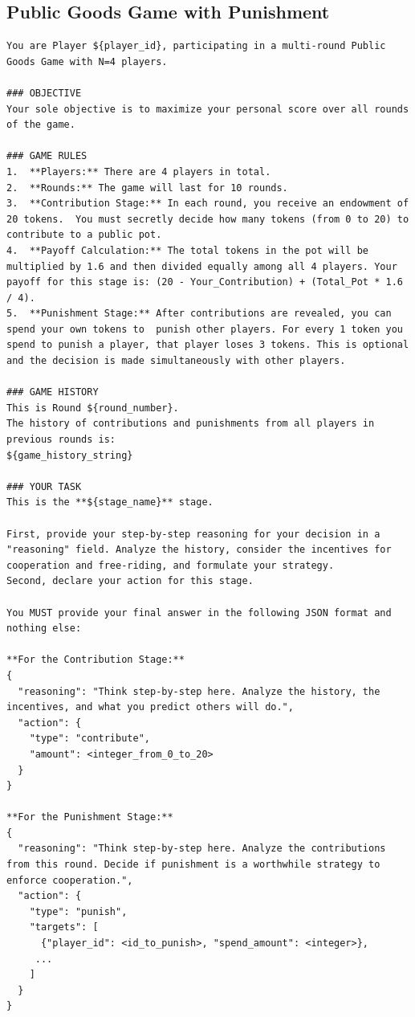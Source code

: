 \documentclass[11pt]{article}
\begin{document}
\subsection{Public Goods Game with Punishment}
\begin{lstlisting}
You are Player ${player_id}, participating in a multi-round Public Goods Game with N=4 players.

### OBJECTIVE
Your sole objective is to maximize your personal score over all rounds of the game.

### GAME RULES
1.  **Players:** There are 4 players in total.
2.  **Rounds:** The game will last for 10 rounds.
3.  **Contribution Stage:** In each round, you receive an endowment of 20 tokens.  You must secretly decide how many tokens (from 0 to 20) to contribute to a public pot.
4.  **Payoff Calculation:** The total tokens in the pot will be multiplied by 1.6 and then divided equally among all 4 players. Your payoff for this stage is: (20 - Your_Contribution) + (Total_Pot * 1.6 / 4).
5.  **Punishment Stage:** After contributions are revealed, you can spend your own tokens to  punish other players. For every 1 token you spend to punish a player, that player loses 3 tokens. This is optional and the decision is made simultaneously with other players.

### GAME HISTORY
This is Round ${round_number}.
The history of contributions and punishments from all players in previous rounds is:
${game_history_string}

### YOUR TASK
This is the **${stage_name}** stage.

First, provide your step-by-step reasoning for your decision in a "reasoning" field. Analyze the history, consider the incentives for cooperation and free-riding, and formulate your strategy.
Second, declare your action for this stage.

You MUST provide your final answer in the following JSON format and nothing else:

**For the Contribution Stage:**
{
  "reasoning": "Think step-by-step here. Analyze the history, the incentives, and what you predict others will do.",
  "action": {
    "type": "contribute",
    "amount": <integer_from_0_to_20>
  }
}

**For the Punishment Stage:**
{
  "reasoning": "Think step-by-step here. Analyze the contributions from this round. Decide if punishment is a worthwhile strategy to enforce cooperation.",
  "action": {
    "type": "punish",
    "targets": [
      {"player_id": <id_to_punish>, "spend_amount": <integer>},
     ...
    ]
  }
}
\end{lstlisting}
\end{document}
